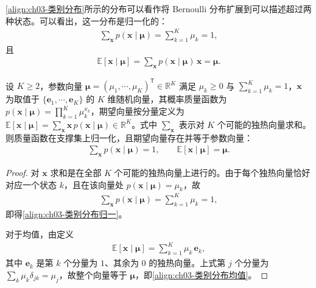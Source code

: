 \documentclass[../../main.tex]{subfiles}
\begin{document}
\cref{align:ch03-类别分布}所示的分布可以看作将 Bernoulli 分布扩展到可以描述超过两种状态。可以看出，这一分布是归一化的：
\begin{align}
\sum_{\boldsymbol{x}}p(\boldsymbol{x}\mid\boldsymbol{\mu})=\sum_{k=1}^{K}\mu_k=1,
\label{align:ch03-类别分布归一}
\end{align}
且
\begin{align}
\mathbb{E}[\boldsymbol{x}\mid\boldsymbol{\mu}]=\sum_{\boldsymbol{x}}p(\boldsymbol{x}\mid\boldsymbol{\mu})\,\boldsymbol{x}=\boldsymbol{\mu}.
\label{align:ch03-类别分布均值}
\end{align}

\begin{proposition}[类别分布的归一化与均值]\label{proposition:ch03-类别分布矩}
设 $K\geqslant2$，参数向量 $\boldsymbol{\mu}=(\mu_1,\cdots,\mu_K)^{\mathsf{T}}\in\mathbb{R}^{K}$ 满足 $\mu_k\geqslant0$ 与 $\sum_{k=1}^{K}\mu_k=1$，$\boldsymbol{x}$ 为取值于 $\{\boldsymbol{e}_1,\cdots,\boldsymbol{e}_K\}$ 的 $K$ 维随机向量，其概率质量函数为 $p(\boldsymbol{x}\mid\boldsymbol{\mu})=\prod_{k=1}^{K}\mu_k^{x_k}$，期望向量按分量定义为 $\mathbb{E}[\boldsymbol{x}\mid\boldsymbol{\mu}]=\sum_{\boldsymbol{x}}\boldsymbol{x}\,p(\boldsymbol{x}\mid\boldsymbol{\mu})\in\mathbb{R}^{K}$。式中 $\sum_{\boldsymbol{x}}$ 表示对 $K$ 个可能的独热向量求和。则质量函数在支撑集上归一化，且期望向量存在并等于参数向量：
\begin{align*}
\sum_{\boldsymbol{x}}p(\boldsymbol{x}\mid\boldsymbol{\mu})=1,\qquad \mathbb{E}[\boldsymbol{x}\mid\boldsymbol{\mu}]=\boldsymbol{\mu}.
\end{align*}
\end{proposition}
\begin{proof}
对 $\boldsymbol{x}$ 求和是在全部 $K$ 个可能的独热向量上进行的。由于每个独热向量恰好对应一个状态 $k$，且在该向量处 $p(\boldsymbol{x}\mid\boldsymbol{\mu})=\mu_k$，故
\begin{align*}
\sum_{\boldsymbol{x}}p(\boldsymbol{x}\mid\boldsymbol{\mu})=\sum_{k=1}^{K}\mu_k=1,
\end{align*}
即得\eqref{align:ch03-类别分布归一}。

对于均值，由定义
\begin{align*}
\mathbb{E}[\boldsymbol{x}\mid\boldsymbol{\mu}]=\sum_{k=1}^{K}\mu_k\,\boldsymbol{e}_k,
\end{align*}
其中 $\boldsymbol{e}_k$ 是第 $k$ 个分量为 $1$、其余为 $0$ 的独热向量。上式第 $j$ 个分量为 $\sum_k\mu_k\delta_{jk}=\mu_j$，故整个向量等于 $\boldsymbol{\mu}$，即\eqref{align:ch03-类别分布均值}。
\end{proof}
\end{document}
